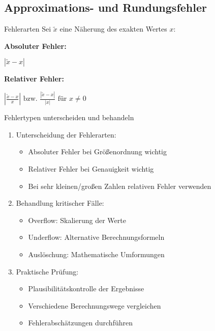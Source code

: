 \subsection{Approximations- und Rundungsfehler}

\begin{definition}{Fehlerarten}
Sei $\tilde{x}$ eine Näherung des exakten Wertes $x$:
\vspace{1mm}\\
\begin{minipage}[t]{0.45\textwidth}
    \textbf{Absoluter Fehler:} 
    \begin{center} $\left|\tilde{x}-x\right|$ \end{center}
\end{minipage}
\hspace{3mm}
\begin{minipage}[t]{0.5\textwidth}
    \textbf{Relativer Fehler:} 
    \begin{center} $\left|\frac{\tilde{x}-x}{x}\right| \text{ bzw. } \frac{|\tilde{x}-x|}{|x|} \text{ für } x \neq 0$ \end{center}
\end{minipage}
\end{definition}

\begin{KR}{Fehlertypen unterscheiden und behandeln}
\begin{enumerate}
    \item Unterscheidung der Fehlerarten:
    \begin{itemize}
        \item Absoluter Fehler bei Größenordnung wichtig 
        \item Relativer Fehler bei Genauigkeit wichtig
        \item Bei sehr kleinen/großen Zahlen relativen Fehler verwenden
    \end{itemize}
    
    \item Behandlung kritischer Fälle:
    \begin{itemize}
        \item Overflow: Skalierung der Werte
        \item Underflow: Alternative Berechnungsformeln
        \item Auslöschung: Mathematische Umformungen
    \end{itemize}
    
    \item Praktische Prüfung:
    \begin{itemize}
        \item Plausibilitätskontrolle der Ergebnisse
        \item Verschiedene Berechnungswege vergleichen
        \item Fehlerabschätzungen durchführen
    \end{itemize}
\end{enumerate}
\end{KR}

